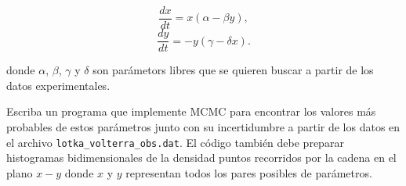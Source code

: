 \documentclass{article}
\begin{document}
\begin{enumerate}
\begin{equation}
\frac{dx}{dt}=x(\alpha - \beta y),
\end{equation}
\begin{equation}
\frac{dy}{dt}=-y(\gamma -\delta x).
\end{equation}

donde $\alpha$, $\beta$, $\gamma$ y $\delta$ son par\'ametors libres
que se quieren buscar a partir de los datos experimentales.

Escriba un programa que implemente MCMC para encontrar los valores
m\'as probables de estos par\'ametros junto con su incertidumbre a
partir de los datos en el archivo \verb"lotka_volterra_obs.dat". El
c\'odigo tambi\'en debe preparar histogramas bidimensionales de la
densidad puntos recorridos por la cadena en el plano $x-y$ donde $x$ y $y$
representan todos los pares posibles de par\'ametros. 

\end{enumerate}
\end{document}
